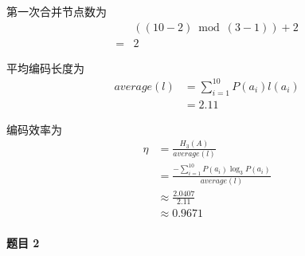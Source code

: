 \documentclass{ctexart}
\begin{document}
\begin{enumerate}
    第一次合并节点数为
    \begin{align}
        & ((10 - 2) \bmod (3 - 1)) + 2 \\
        =& 2
    \end{align}

    平均编码长度为
    \begin{align}
        average(l) &= \sum_{i=1}^{10} P(a_i)l(a_i) \\
        &= 2.11
    \end{align}

    编码效率为
    \begin{align}
        \eta &= \frac{H_3(A)}{average(l)} \\
        &= \frac{-\sum_{i=1}^{10} P(a_i)\log_3 P(a_i)}{average(l)} \\
        &\approx \frac{2.0407}{2.11} \\
        &\approx 0.9671
    \end{align}
\end{enumerate}

\paragraph{题目 2}
\end{document}
